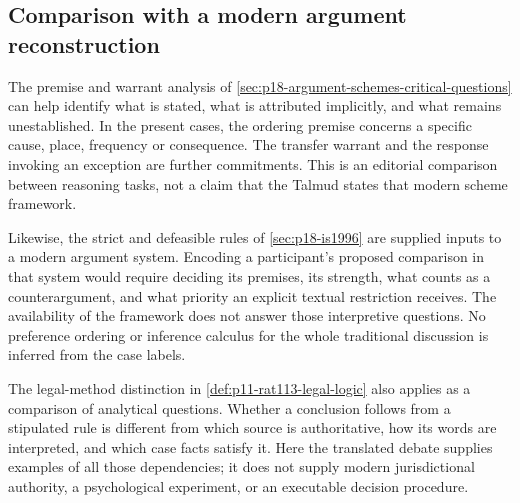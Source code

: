 \subsection{Comparison with a modern argument reconstruction}
\label{sec:p18-talmudic-modern-boundary}

The premise and warrant analysis of
\cref{sec:p18-argument-schemes-critical-questions} can help identify
what is stated, what is attributed implicitly, and what remains
unestablished. In the present cases, the ordering premise concerns
a specific cause, place, frequency or consequence. The transfer
warrant and the response invoking an exception are further
commitments. This is an editorial comparison between reasoning tasks,
not a claim that the Talmud states that modern scheme framework.

Likewise, the strict and defeasible rules of
\cref{sec:p18-is1996} are supplied inputs to a modern argument system.
Encoding a participant's proposed comparison in that system would
require deciding its premises, its strength, what counts as a
counterargument, and what priority an explicit textual restriction
receives. The availability of the framework does not answer those
interpretive questions. No preference ordering or inference calculus
for the whole traditional discussion is inferred from the case labels.

The legal-method distinction in \cref{def:p11-rat113-legal-logic}
also applies as a comparison of analytical questions. Whether a
conclusion follows from a stipulated rule is different from which
source is authoritative, how its words are interpreted, and which
case facts satisfy it. Here the translated debate supplies examples
of all those dependencies; it does not supply modern jurisdictional
authority, a psychological experiment, or an executable decision
procedure.

